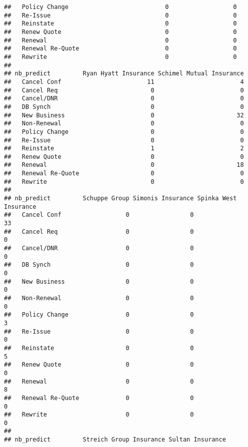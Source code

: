 \documentclass[]{article}
\begin{document}
\begin{verbatim}
##   Policy Change                           0                  0
##   Re-Issue                                0                  0
##   Reinstate                               0                  0
##   Renew Quote                             0                  0
##   Renewal                                 0                  0
##   Renewal Re-Quote                        0                  0
##   Rewrite                                 0                  0
##                   
## nb_predict         Ryan Hyatt Insurance Schimel Mutual Insurance
##   Cancel Conf                        11                        4
##   Cancel Req                          0                        0
##   Cancel/DNR                          0                        0
##   DB Synch                            0                        0
##   New Business                        0                       32
##   Non-Renewal                         0                        0
##   Policy Change                       0                        0
##   Re-Issue                            0                        0
##   Reinstate                           1                        2
##   Renew Quote                         0                        0
##   Renewal                             0                       18
##   Renewal Re-Quote                    0                        0
##   Rewrite                             0                        0
##                   
## nb_predict         Schuppe Group Simonis Insurance Spinka West Insurance
##   Cancel Conf                  0                 0                    33
##   Cancel Req                   0                 0                     0
##   Cancel/DNR                   0                 0                     0
##   DB Synch                     0                 0                     0
##   New Business                 0                 0                     0
##   Non-Renewal                  0                 0                     0
##   Policy Change                0                 0                     3
##   Re-Issue                     0                 0                     0
##   Reinstate                    0                 0                     5
##   Renew Quote                  0                 0                     0
##   Renewal                      0                 0                     8
##   Renewal Re-Quote             0                 0                     0
##   Rewrite                      0                 0                     0
##                   
## nb_predict         Streich Group Insurance Sultan Insurance

\end{verbatim}
\end{document}

